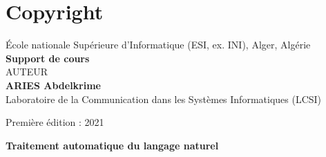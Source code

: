 \documentclass[12pt]{book}
\begin{document}
\fi



\chapter*{Copyright}

\begin{center}
	École nationale Supérieure d'Informatique (ESI, ex. INI), Alger, Algérie \\
	\textbf{Support de cours} \\[1cm]
	{\Large AUTEUR}\\[.5cm]
	{\LARGE\bfseries ARIES Abdelkrime}\\
	Laboratoire de la Communication dans les Systèmes Informatiques (LCSI)
\end{center}

Première édition : 2021


\begin{center}
	{\Huge \textbf{Traitement automatique du langage naturel}}
\end{center}
\end{document}
